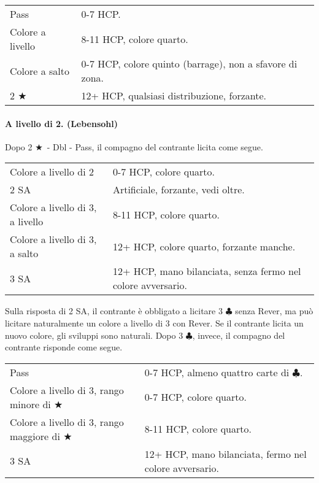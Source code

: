 \documentclass[a4paper,10pt]{article}
\renewcommand{\c}{$\clubsuit$\xspace}
\renewcommand{\j}{$\bigstar$\xspace}
\newcommand{\sa}{SA\xspace}
\newcommand{\smallspace}{\vskip0.3cm}
\newenvironment{twocol}
  {\smallspace\noindent\begin{tabular}{l p{0.78\textwidth}}}
  {\end{tabular}\smallspace}
\begin{document}
\begin{twocol}
	Pass & 0-7 HCP. \\
	Colore a livello & 8-11 HCP, colore quarto. \\
	Colore a salto & 0-7 HCP, colore quinto (barrage), non a sfavore di zona. \\
	2 \j & 12+ HCP, qualsiasi distribuzione, forzante. \\
\end{twocol}

\paragraph{A livello di 2. (Lebensohl)} Dopo 2 \j\ - Dbl - Pass, il compagno del contrante licita come segue.


\begin{twocol}
	Colore a livello di 2 & 0-7 HCP, colore quarto. \\
	2 \sa & Artificiale, forzante, vedi oltre. \\
	Colore a livello di 3, a livello & 8-11 HCP, colore quarto. \\
	Colore a livello di 3, a salto & 12+ HCP, colore quarto, forzante manche. \\
	3 \sa & 12+ HCP, mano bilanciata, senza fermo nel colore avversario.
\end{twocol}

Sulla risposta di 2 \sa, il contrante è obbligato a licitare 3 \c senza Rever, ma può licitare naturalmente un colore a livello di 3 con Rever. Se il contrante licita un nuovo colore, gli sviluppi sono naturali. Dopo 3 \c, invece, il compagno del contrante risponde come segue.

\begin{twocol}
	Pass & 0-7 HCP, almeno quattro carte di \c. \\
	Colore a livello di 3, rango minore di \j & 0-7 HCP, colore quarto. \\
	Colore a livello di 3, rango maggiore di \j & 8-11 HCP, colore quarto. \\
	3 \sa & 12+ HCP, mano bilanciata, fermo nel colore avversario.
\end{twocol}
\end{document}

